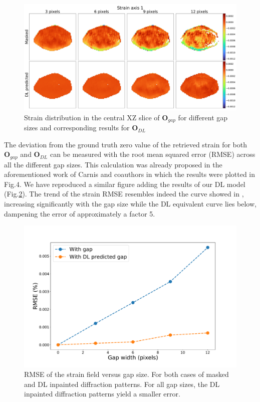 \begin{figure}[ht]
    \centering
    \includegraphics[width=\textwidth]{figures/Inpainting/strain_comparison_allGaps.pdf}
    \caption{Strain distribution in the central XZ slice of $\textbf{O}_{gap}$ for different gap sizes and 
    corresponding results for $\textbf{O}_{DL}$}
    \label{fig:Carnis_allgaps_strain}
\end{figure}

The deviation from the ground truth zero value of the retrieved strain for both $\textbf{O}_{gap}$ and $\textbf{O}_{DL}$
can be measured with the root mean squared error (RMSE) across all the different gap sizes. This calculation was already
proposed in the aforementioned work of Carnis and coauthors in which the results were plotted in Fig.4. We have reproduced
a similar figure adding the results of our DL model (Fig.\ref{fig:Carnis_std}). The trend of the strain RMSE 
resembles indeed the curve showed in \cite{carnis_towards_2019}, increasing significantly with the gap size 
while the DL equivalent curve lies below, dampening the error of approximately a factor 5. 


\begin{figure}[ht]
    \centering
    \includegraphics[width=\textwidth]{figures/Inpainting/std_strain_comparison.pdf}
    \caption{RMSE of the strain field versus gap size. For both cases of masked and DL inpainted diffraction
    patterns. For all gap sizes, the DL inpainted diffraction patterns yield a smaller error.
    }
    \label{fig:Carnis_std}
\end{figure}

